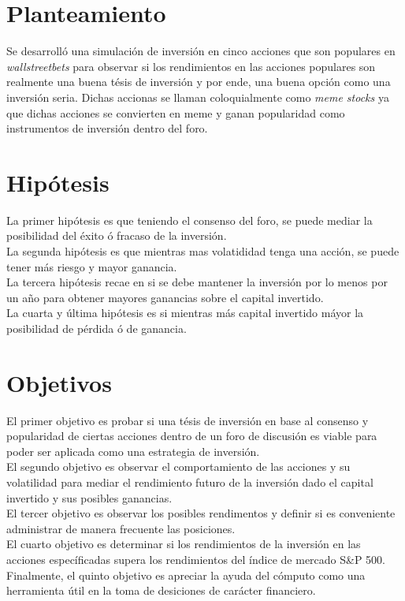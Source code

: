 \documentclass[letterpaper, 12pt]{article}
\begin{document}
\begin{justify}
        \section{Planteamiento}
        \justify
        Se desarrolló una simulación de inversión en cinco acciones que son populares en \emph{wallstreetbets} para observar si los rendimientos en las acciones
        populares son realmente una buena tésis de inversión y por ende, una buena opción como una inversión seria. Dichas accionas se llaman coloquialmente como \emph{meme stocks} ya que dichas acciones
        se convierten en meme y ganan popularidad como instrumentos de inversión dentro del foro.
        \section{Hipótesis}
        \justify
        La primer hipótesis es que teniendo el consenso del foro, se puede mediar la posibilidad del éxito ó fracaso de la inversión.
        \\\newline
        La segunda hipótesis es que mientras mas volatididad tenga una acción, se puede tener más riesgo y mayor ganancia. 
        \\\newline
        La tercera hipótesis recae en si se debe mantener la inversión por lo menos por un año para obtener mayores ganancias sobre el capital invertido.
        \\\newline
        La cuarta y última hipótesis es si mientras más capital invertido máyor la posibilidad de pérdida ó de ganancia.        
        \section{Objetivos}
        \justify
        El primer objetivo es probar si una tésis de inversión en base al consenso y popularidad de ciertas acciones dentro de un foro de discusión es viable para poder ser aplicada como una estrategia de inversión.
        \\\newline
        El segundo objetivo es observar el comportamiento de las acciones y su volatilidad para mediar el rendimiento futuro de la inversión dado el capital invertido y sus posibles ganancias.
        \\\newline
        El tercer objetivo es observar los posibles rendimentos y definir si es conveniente administrar de manera frecuente las posiciones.
        \\\newline
        El cuarto objetivo es determinar si los rendimientos de la inversión en las acciones específicadas supera los rendimientos del índice de mercado S\&P 500.
        \\\newline
        Finalmente, el quinto objetivo es apreciar la ayuda del cómputo como una herramienta útil en la toma de desiciones de carácter financiero.

\end{justify}
\end{document}
